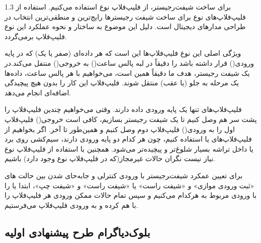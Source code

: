 \documentclass[a4paper,12pt]{article}
\numberwithin{figure}{subsection}
\begin{document}
\begin{spacing}{1.3} 
برای ساخت شیفت‌رجیستر، از فلیپ‌فلاپ نوع  استفاده می‌کنیم. استفاده از فلیپ‌فلاپ‌های نوع  برای ساخت شیفت رجیسترها رایج‌ترین و منطقی‌ترین انتخاب در طراحی مدارهای دیجیتال است. دلیل این موضوع به ساختار و نحوه عملکرد این نوع فلیپ‌فلاپ برمی‌گردد.


ویژگی اصلی این نوع فلیپ‌فلاپ‌ها این است که هر داده‌ای (صفر یا یک) که در پایه ورودی() قرار داشته باشد را دقیقاً در لبه پالس ساعت() به خروجی() منتفل می‌کند.در یک شیفت رجیستر، هدف ما دقیقاً همین است، می‌خواهیم با هر پالس ساعت، داده‌ها یک مرحله به جلو (یا عقب) منتقل شوند. فلیپ‌فلاپ  این کار را بدون هیچ پیچیدگی اضافه‌ای انجام می‌دهد.

فلیپ‌فلاپ‌های  تنها یک پایه ورودی داده دارند. وقتی می‌خواهیم چندین فلیپ‌فلاپ را پشت سر هم وصل کنیم تا یک شیفت رجیستر بسازیم، کافی است خروجی() فلیپ‌فلاپ اول را به ورودی() فلیپ‌فلاپ دوم وصل کنیم و همین‌طور تا آخر.
اگر بخواهیم از فلیپ‌فلاپ‌های  یا  استفاده کنیم، چون هر کدام دو پایه ورودی دارند، سیم‌کشی روی برد یا داخل تراشه بسیار شلوغ‌تر و پیچیده‌تر می‌شود.
همچنین با استفاده از فلیپ‌فلاپ نوع  نیاز نیست نگران حالات غیرمجاز(که در فلیپ‌فلاپ نوع  وجود دارد) باشیم.

برای تعیین عمکرد شیفت‌‍رجیستر با ورودی کنترلی  و جابه‌حای شدن بین حالت های «ثبت ورودی موازی» و «شیفت راست» یا «شیفت راست» و «شیفت چپ»، ابتدا  یا  را با ورودی مربوط به هرکدام  می‌کنیم و سپس تمام حالات ممکن ورودی هر فلیپ‌فلاپ را با هم  کرده و به ورودی فلیپ‌فلاپ می‌فرستیم.
\end{spacing}

\subsection{بلوک‌دیاگرام طرح پیشنهادی اولیه}
\leavevmode\par
\vspace{0.2cm}
\end{document}

